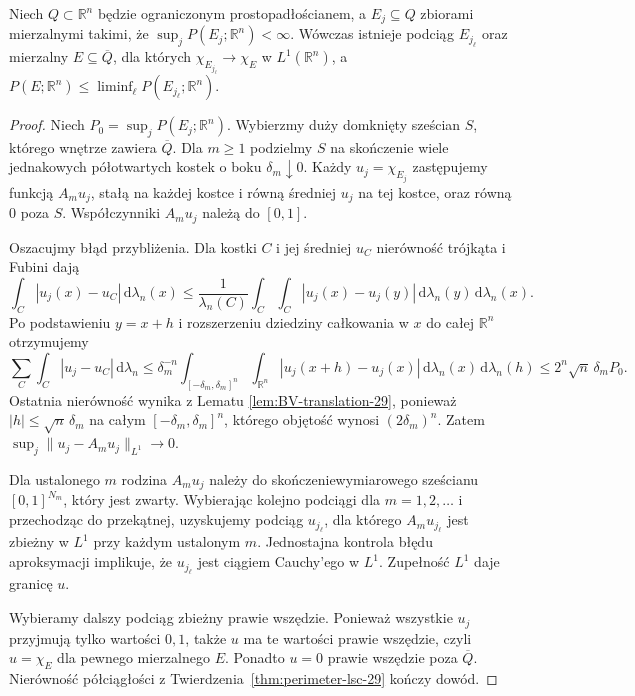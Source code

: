 \begin{twierdzenie}
\label{thm:perimeter-compact-29}
Niech $Q\subset\mathbb R^n$ będzie ograniczonym
prostopadłościanem, a $E_j\subseteq Q$ zbiorami
mierzalnymi takimi, że
$\sup_j P(E_j;\mathbb R^n)<\infty$.
Wówczas istnieje podciąg $E_{j_\ell}$ oraz
mierzalny $E\subseteq\overline Q$, dla których
$\chi_{E_{j_\ell}}\to\chi_E$ w $L^1(\mathbb R^n)$,
a $P(E;\mathbb R^n)\le\liminf_\ell P(E_{j_\ell};\mathbb R^n)$.
\end{twierdzenie}
\begin{proof}
Niech $P_0=\sup_jP(E_j;\mathbb R^n)$.
Wybierzmy duży domknięty sześcian $S$, którego wnętrze
zawiera $\overline Q$. Dla $m\ge1$ podzielmy $S$
na skończenie wiele jednakowych półotwartych
kostek o boku $\delta_m\downarrow0$.
Każdy $u_j=\chi_{E_j}$ zastępujemy funkcją
$A_m u_j$, stałą na każdej kostce i równą
średniej $u_j$ na tej kostce, oraz równą $0$ poza $S$.
Współczynniki $A_m u_j$ należą do $[0,1]$.

Oszacujmy błąd przybliżenia. Dla kostki $C$
i jej średniej $u_C$ nierówność trójkąta i Fubini dają
\[
 \int_C|u_j(x)-u_C|\,\mathrm d\lambda_n(x)
 \le\frac1{\lambda_n(C)}\int_C\int_C
 |u_j(x)-u_j(y)|\,\mathrm d\lambda_n(y)
 \,\mathrm d\lambda_n(x).
\]
Po podstawieniu $y=x+h$ i rozszerzeniu dziedziny
całkowania w $x$ do całej $\mathbb R^n$ otrzymujemy
\[
 \sum_C\int_C|u_j-u_C|\,\mathrm d\lambda_n
 \le\delta_m^{-n}\int_{[-\delta_m,\delta_m]^n}
 \int_{\mathbb R^n}|u_j(x+h)-u_j(x)|
 \,\mathrm d\lambda_n(x)\,\mathrm d\lambda_n(h)
 \le 2^n\sqrt n\,\delta_m P_0.
\]
Ostatnia nierówność wynika z Lematu
\ref{lem:BV-translation-29}, ponieważ $|h|\le\sqrt n\,\delta_m$
na całym $[-\delta_m,\delta_m]^n$, którego objętość
wynosi $(2\delta_m)^n$. Zatem
$\sup_j\|u_j-A_mu_j\|_{L^1}\to0$.

Dla ustalonego $m$ rodzina $A_m u_j$ należy do
skończeniewymiarowego sześcianu $[0,1]^{N_m}$,
który jest zwarty. Wybierając kolejno podciągi dla
$m=1,2,\ldots$ i przechodząc do przekątnej,
uzyskujemy podciąg $u_{j_\ell}$, dla którego
$A_m u_{j_\ell}$ jest zbieżny w $L^1$
przy każdym ustalonym $m$. Jednostajna kontrola
błędu aproksymacji implikuje, że $u_{j_\ell}$
jest ciągiem Cauchy'ego w $L^1$. Zupełność
$L^1$ daje granicę $u$.

Wybieramy dalszy podciąg zbieżny prawie wszędzie.
Ponieważ wszystkie $u_j$ przyjmują tylko wartości
$0,1$, także $u$ ma te wartości prawie wszędzie,
czyli $u=\chi_E$ dla pewnego mierzalnego $E$.
Ponadto $u=0$ prawie wszędzie poza $\overline Q$.
Nierówność półciągłości z
Twierdzenia~\ref{thm:perimeter-lsc-29} kończy dowód.
\end{proof}

